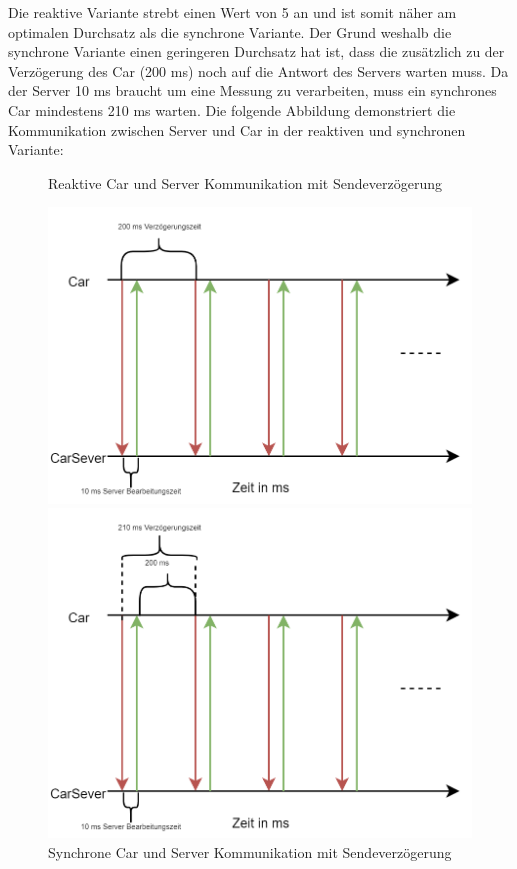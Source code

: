 Die reaktive Variante strebt einen Wert von 5 an und ist somit näher am optimalen Durchsatz als die synchrone Variante. Der Grund weshalb die synchrone Variante einen geringeren Durchsatz hat ist, dass die zusätzlich zu der Verzögerung des Car (200 ms) noch auf die Antwort des Servers warten muss. Da der Server 10 ms braucht um eine Messung zu verarbeiten, muss ein synchrones Car mindestens 210 ms warten. Die folgende Abbildung demonstriert die Kommunikation zwischen Server und Car in der reaktiven und synchronen Variante:
\begin{center}
\begin{figure}
\caption{Reaktive Car und Server Kommunikation mit Sendeverzögerung}
\includegraphics[scale=.5]{./media/with_delay_reactive.png}
\caption{Synchrone Car und Server Kommunikation mit Sendeverzögerung}
\includegraphics[scale=.5]{./media/with_delay_synchron.png}
\end{figure}
\end{center}

